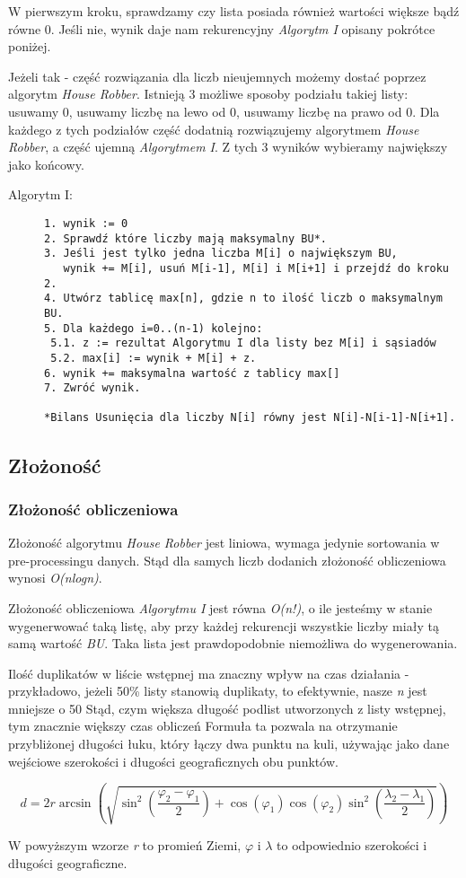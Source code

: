 \documentclass[11pt]{article} %
\begin{document}
W pierwszym kroku, sprawdzamy czy lista posiada również wartości większe bądź równe 0. Jeśli nie, wynik daje nam rekurencyjny \textsl{Algorytm I} opisany pokrótce poniżej. 

Jeżeli tak - część rozwiązania dla liczb nieujemnych możemy dostać poprzez algorytm \textsl{House Robber}. Istnieją 3 możliwe sposoby podziału takiej listy: usuwamy 0, usuwamy liczbę na lewo od 0, usuwamy liczbę na prawo od 0.
Dla każdego z tych podziałów część dodatnią rozwiązujemy algorytmem \textsl{House Robber}, a część ujemną \textsl{Algorytmem I}. Z tych 3 wyników wybieramy największy jako końcowy.\\

\begin{description}
\item[Algorytm I:]\leavevmode
\begin{lstlisting}
1. wynik := 0
2. Sprawdź które liczby mają maksymalny BU*.
3. Jeśli jest tylko jedna liczba M[i] o największym BU, 
   wynik += M[i], usuń M[i-1], M[i] i M[i+1] i przejdź do kroku 2.
4. Utwórz tablicę max[n], gdzie n to ilość liczb o maksymalnym BU.
5. Dla każdego i=0..(n-1) kolejno: 
 5.1. z := rezultat Algorytmu I dla listy bez M[i] i sąsiadów
 5.2. max[i] := wynik + M[i] + z.
6. wynik += maksymalna wartość z tablicy max[]
7. Zwróć wynik.

*Bilans Usunięcia dla liczby N[i] równy jest N[i]-N[i-1]-N[i+1].
\end{lstlisting}
\end{description}

\subsection{Złożoność}
\subsubsection{Złożoność obliczeniowa}
Złożoność algorytmu \textsl{House Robber} jest liniowa, wymaga jedynie sortowania w pre-processingu danych. Stąd dla samych liczb dodanich złożoność obliczeniowa wynosi \textsl{O(nlogn)}.

Złożoność obliczeniowa \textsl{Algorytmu I} jest równa \textsl{O(n!)}, o ile jesteśmy w stanie wygenerwować taką listę, aby przy każdej rekurencji wszystkie liczby miały tą samą wartość \textsl{BU}. Taka lista jest prawdopodobnie niemożliwa do wygenerowania.

Ilość duplikatów w liście wstępnej ma znaczny wpływ na czas działania - przykładowo, jeżeli 50\% listy stanowią duplikaty, to efektywnie, nasze \textsl{n} jest mniejsze o 50%
Stąd, czym większa długość podlist utworzonych z listy wstępnej, tym znacznie większy czas obliczeń
Formuła ta pozwala na otrzymanie przybliżonej długości łuku, który łączy dwa punktu na kuli, używając jako dane wejściowe szerokości i długości geograficznych obu punktów.
\begin{center}
\[ d = 2r \arcsin\left(\sqrt{\sin^2\left(\frac{\varphi_2 - \varphi_1}{2}\right) + \cos(\varphi_1) \cos(\varphi_2)\sin^2\left(\frac{\lambda_2 - \lambda_1}{2}\right)}\right) \]
\end{center}
W powyższym wzorze \textsl{r} to promień Ziemi, $\varphi$ i $\lambda$ to odpowiednio szerokości i długości geograficzne.
\end{document}
